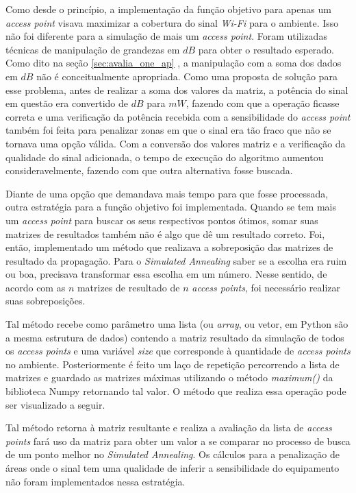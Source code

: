 \documentclass[
	12pt,				%
	twoside,			%
	a4paper,			%
	english,			%
	french,				%
	spanish,			%
	brazil				%
	]{abntex2}
\begin{document}
Como desde o princípio, a implementação da função objetivo para apenas
um \emph{access point} visava maximizar a cobertura do sinal
\emph{Wi-Fi} para o ambiente. Isso não foi diferente para a simulação de
mais um \emph{access point}. Foram utilizadas técnicas de manipulação de
grandezas em \(dB\) para obter o resultado esperado. Como dito na seção
\ref{sec:avalia_one_ap} , a manipulação com a soma dos dados em \(dB\)
não é conceitualmente apropriada. Como uma proposta de solução para esse
problema, antes de realizar a soma dos valores da matriz, a potência do
sinal em questão era convertido de \(dB\) para \(mW\), fazendo com que a
operação ficasse correta e uma verificação da potência recebida com a
sensibilidade do \emph{access point} também foi feita para penalizar
zonas em que o sinal era tão fraco que não se tornava uma opção válida.
Com a conversão dos valores matriz e a verificação da qualidade do sinal
adicionada, o tempo de execução do algoritmo aumentou consideravelmente,
fazendo com que outra alternativa fosse buscada.

Diante de uma opção que demandava mais tempo para que fosse processada,
outra estratégia para a função objetivo foi implementada. Quando se tem
mais um \emph{access point} para buscar os seus respectivos pontos
ótimos, somar suas matrizes de resultados também não é algo que dê um
resultado correto. Foi, então, implementado um método que realizava a
sobreposição das matrizes de resultado da propagação. Para o
\emph{Simulated Annealing} saber se a escolha era ruim ou boa, precisava
transformar essa escolha em um número. Nesse sentido, de acordo com as
\(n\) matrizes de resultado de \(\textit{n}\) \emph{access points}, foi
necessário realizar suas sobreposições.

Tal método recebe como parâmetro uma lista (ou \emph{array}, ou vetor,
em Python são a mesma estrutura de dados) contendo a matriz resultado da
simulação de todos os \emph{access points} e uma variável \emph{size}
que corresponde à quantidade de \emph{access points} no ambiente.
Posteriormente é feito um laço de repetição percorrendo a lista de
matrizes e guardado as matrizes máximas utilizando o método
\emph{maximum()} da biblioteca Numpy retornando tal valor. O método que
realiza essa operação pode ser visualizado a seguir.



Tal método retorna à matriz resultante e realiza a avaliação da lista de
\emph{access points} fará uso da matriz para obter um valor a se
comparar no processo de busca de um ponto melhor no \emph{Simulated
Annealing}. Os cálculos para a penalização de áreas onde o sinal tem uma
qualidade de inferir a sensibilidade do equipamento não foram
implementados nessa estratégia.
\end{document}
